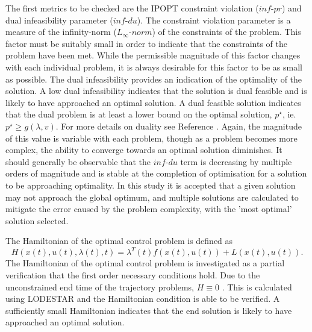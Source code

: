 The first metrics to be checked are the IPOPT constraint violation ($inf\textrm{-}pr$) and dual infeasibility parameter ($inf\textrm{-}du$)\cite{Kawajir2010}. The constraint violation parameter is a measure of the infinity-norm ($L_\infty\textrm{-}norm$) of the constraints of the problem\cite{Kawajir2010}. This factor must be suitably small in order to indicate that the constraints of the problem have been met. While the permissible magnitude of this factor changes with each individual problem, it is always desirable for this factor to be as small as possible. The dual infeasibility provides an indication of the optimality of the solution. A low dual infeasibility indicates that the solution is dual feasible and is likely to have approached an optimal solution. A dual feasible solution indicates that the dual problem is at least a lower bound on the optimal solution, $p^\star$, ie. $p^\star \geq g(\lambda,v)$. For more details on duality see Reference \cite{Hindi2006}.
 Again, the magnitude of this value is variable with each problem, though as a problem becomes more complex, the ability to converge towards an optimal solution diminishes. It should generally be observable that the $inf\textrm{-}du$ term is decreasing by multiple orders of magnitude and is stable at the completion of optimisation for a solution to be approaching optimality. In this study it is accepted that a given solution may not approach the global optimum, and multiple solutions are calculated to mitigate the error caused by the problem complexity, with the 'most optimal' solution selected. 


The Hamiltonian of the optimal control problem is defined as 
\begin{equation}
H(x(t),u(t),\lambda(t),t) = \lambda^T(t)f(x(t),u(t)) + L(x(t),u(t)).
\end{equation}
The Hamiltonian of the optimal control problem is investigated as a partial verification that the first order necessary conditions hold. Due to the unconstrained end time of the trajectory problems, $H\equiv 0 $ \cite{Pucci2007}. 
This is calculated using LODESTAR and the Hamiltonian condition is able to be verified. A sufficiently small Hamiltonian indicates that the end solution is likely to have approached an optimal solution.


